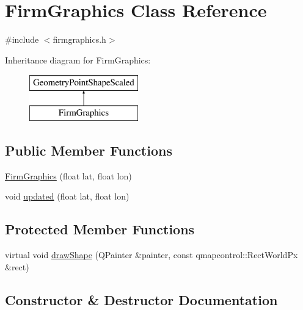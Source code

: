 \hypertarget{class_firm_graphics}{}\section{Firm\+Graphics Class Reference}
\label{class_firm_graphics}


{\ttfamily \#include $<$firmgraphics.\+h$>$}

Inheritance diagram for Firm\+Graphics\+:\begin{figure}[H]
\begin{center}
\leavevmode
\includegraphics[height=2.000000cm]{df/d7b/class_firm_graphics}
\end{center}
\end{figure}
\subsection*{Public Member Functions}
\begin{DoxyCompactItemize}
\item 
\mbox{\hyperlink{class_firm_graphics_ab1bb09fdfef11889c3bfb92c38541663}{Firm\+Graphics}} (float lat, float lon)
\item 
void \mbox{\hyperlink{class_firm_graphics_a64e35abd5ff32589fa3fa0b88c55cbaa}{updated}} (float lat, float lon)
\end{DoxyCompactItemize}
\subsection*{Protected Member Functions}
\begin{DoxyCompactItemize}
\item 
virtual void \mbox{\hyperlink{class_firm_graphics_a79ed249801cc7997486bc024684ce014}{draw\+Shape}} (Q\+Painter \&painter, const qmapcontrol\+::\+Rect\+World\+Px \&rect)
\end{DoxyCompactItemize}


\subsection{Constructor \& Destructor Documentation}
\mbox{\label{class_firm_graphics_ab1bb09fdfef11889c3bfb92c38541663}} 
